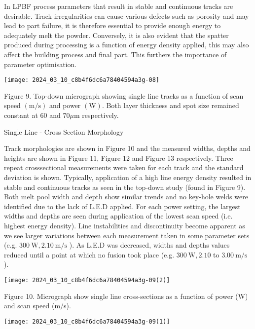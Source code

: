 \documentclass[10pt]{article}
\begin{document}
In LPBF process parameters that result in stable and continuous tracks are desirable. Track irregularities can cause various defects such as porosity and may lead to part failure, it is therefore essential to provide enough energy to adequately melt the powder. Conversely, it is also evident that the spatter produced during processing is a function of energy density applied, this may also affect the building process and final part. This furthers the importance of parameter optimisation.

\begin{center}
\texttt{[image: 2024\_03\_10\_c8b4f6dc6a78404594a3g-08]}
\end{center}

Figure 9. Top-down micrograph showing single line tracks as a function of scan speed $(\mathrm{m} / \mathrm{s})$ and power $(\mathrm{W})$. Both layer thickness and spot size remained constant at 60 and $70 \mu \mathrm{m}$ respectively.

Single Line - Cross Section Morphology

Track morphologies are shown in Figure 10 and the measured widths, depths and heights are shown in Figure 11, Figure 12 and Figure 13 respectively. Three repeat crosssectional measurements were taken for each track and the standard deviation is shown. Typically, application of a high line energy density resulted in stable and continuous tracks as seen in the top-down study (found in Figure 9). Both melt pool width and depth show similar trends and no key-hole welds were identified due to the lack of L.E.D applied. For each power setting, the largest widths and depths are seen during application of the lowest scan speed (i.e. highest energy density). Line instabilities and discontinuity become apparent as we see larger variations between each measurement taken in some parameter sets (e.g. $300 \mathrm{~W}, 2.10 \mathrm{~m} / \mathrm{s}$ ). As L.E.D was decreased, widths and depths values reduced until a point at which no fusion took place (e.g. $300 \mathrm{~W}, 2.10$ to $3.00 \mathrm{~m} / \mathrm{s}$ ).

\begin{center}
\texttt{[image: 2024\_03\_10\_c8b4f6dc6a78404594a3g-09(2)]}
\end{center}

Figure 10. Micrograph show single line cross-sections as a function of power (W) and scan speed (m/s).

\begin{center}
\texttt{[image: 2024\_03\_10\_c8b4f6dc6a78404594a3g-09(1)]}
\end{center}
\end{document}
